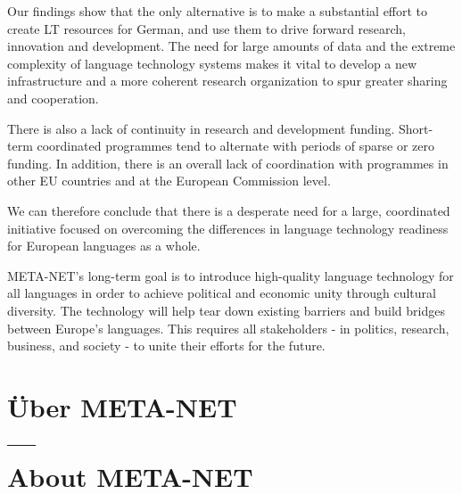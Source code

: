 \documentclass[]{../../metanetpaper}
\begin{document}
\begin{Parallel}[c]{80mm}{80mm}
{    Our findings show that the only alternative is to make a substantial effort to create LT resources for German, and use them to drive forward research, innovation and development. The need for large amounts of data and the extreme complexity of language technology systems makes it vital to develop a new infrastructure and a more coherent research organization to spur greater sharing and cooperation.

    There is also a lack of continuity in research and development funding. Short-term coordinated programmes tend to alternate with periods of sparse or zero funding. In addition, there is an overall lack of coordination with programmes in other EU countries and at the European Commission level.

    We can therefore conclude that there is a desperate need for a large, coordinated initiative focused on overcoming the differences in language technology readiness for European languages as a whole.

    META-NET’s long-term goal is to introduce high-quality language technology for all languages in order to achieve political and economic unity through cultural diversity. The technology will help tear down existing barriers and build bridges between Europe’s languages. This requires all stakeholders - in politics, research, business, and society - to unite their efforts for the future.
  }

  \ParallelPar
  
  \clearpage


  \section[Über META-NET --- About META-NET]{Über META-NET\\ ---\\ About META-NET}
  

\end{Parallel}
\end{document}
